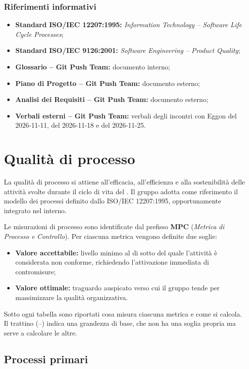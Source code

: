 \documentclass[documento]{gpt}
\begin{document}
\subsubsection{Riferimenti informativi}
\begin{itemize}
    \item \textbf{Standard ISO/IEC 12207:1995:} \textit{Information Technology -- Software Life Cycle Processes};
    \item \textbf{Standard ISO/IEC 9126:2001:} \textit{Software Engineering -- Product Quality};
    \item \textbf{Glossario -- Git Push Team:} documento interno;
    \item \textbf{Piano di Progetto -- Git Push Team:} documento esterno;
    \item \textbf{Analisi dei Requisiti -- Git Push Team:} documento esterno;
    \item \textbf{Verbali esterni -- Git Push Team:} verbali degli incontri con Eggon del 2026-11-11, del 2026-11-18 e del 2026-11-25.
\end{itemize}


\section{Qualità di processo}
La qualità di processo si attiene all'efficacia, all'efficienza e alla sostenibilità delle attività svolte durante il ciclo di vita del . Il gruppo adotta come riferimento il modello dei processi definito dallo  ISO/IEC 12207:1995, opportunamente integrato nel  interno.

Le misurazioni di processo sono identificate dal prefisso \textbf{MPC} (\textit{Metrica di Processo e Controllo}). Per ciascuna metrica vengono definite due soglie:
\begin{itemize}
    \item \textbf{Valore accettabile:} livello minimo al di sotto del quale l'attività è considerata non conforme, richiedendo l'attivazione immediata di contromisure;
    \item \textbf{Valore ottimale:} traguardo auspicato verso cui il gruppo tende per massimizzare la qualità organizzativa.
\end{itemize}
Sotto ogni tabella sono riportati cosa misura ciascuna metrica e come si calcola. Il trattino (--) indica una grandezza di base, che non ha una soglia propria ma serve a calcolare le altre.

\subsection{Processi primari}
\end{document}
